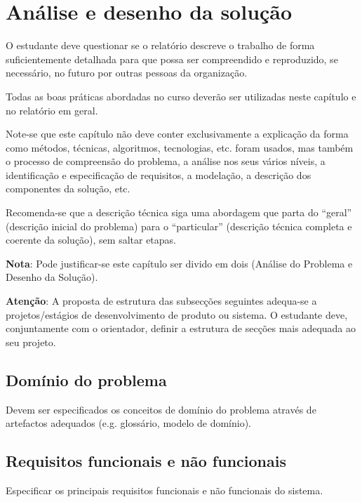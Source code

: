% 
\chapter{Análise e desenho da solução} %
\label{chap:ADS} %

O estudante deve questionar se o relatório descreve o trabalho de forma suficientemente detalhada para que possa ser compreendido e reproduzido, se necessário, no futuro por outras pessoas da organização. 

Todas as boas práticas abordadas no curso deverão ser utilizadas neste capítulo e no relatório em geral. 

Note-se que este capítulo não deve conter exclusivamente a explicação da forma como métodos, técnicas, algoritmos, tecnologias, etc. foram usados, mas também o processo de compreensão do problema, a análise nos seus vários níveis, a identificação e especificação de requisitos, a modelação, a descrição dos componentes da solução, etc. 

Recomenda-se que a descrição técnica siga uma abordagem que parta do “geral” (descrição inicial do problema) para o “particular” (descrição técnica completa e coerente da solução), sem saltar etapas.


\textbf{Nota}: Pode justificar-se este capítulo ser divido em dois (Análise do Problema e Desenho da Solução).

\textbf{Atenção}: A proposta de estrutura das subsecções seguintes adequa-se a projetos/estágios de desenvolvimento de produto ou sistema. O estudante deve, conjuntamente com o orientador, definir a estrutura de secções mais adequada ao seu projeto.


\section{Domínio do problema} 
\label{sec:DP} 
Devem ser especificados os conceitos de domínio do problema através de artefactos adequados (e.g. glossário, modelo de domínio). 

\section{Requisitos funcionais e não funcionais} 
\label{sec:Req} 
Especificar os principais requisitos funcionais e não funcionais do sistema. 

